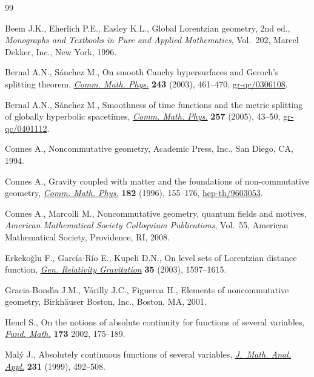 \documentclass[pdftex]{sigma}
\begin{document}
\begin{thebibliography}{99}

\footnotesize\itemsep=0pt

Beem J.K., Eherlich P.E., Easley K.L.,
Global Lorentzian geometry,  2nd ed., {\it Monographs and Textbooks in Pure and Applied Mathematics}, Vol.~202, Marcel Dekker, Inc., New York, 1996.

Bernal A.N., S\'anchez M.,
On smooth Cauchy hypersurfaces and Geroch's splitting theorem,
\href{http://dx.doi.org/10.1007/s00220-003-0982-6}{{\it Comm. Math. Phys.}} {\bf 243} (2003), 461--470,
\href{http://www.arxiv.org/abs/gr-qc/0306108}{gr-qc/0306108}.

Bernal A.N., S\'anchez M.,
Smoothness of time functions and the metric splitting of globally hyperbolic spacetimes,
\href{http://dx.doi.org/10.1007/s00220-005-1346-1}{{\it Comm. Math. Phys.}} {\bf 257} (2005), 43--50,
\href{http://www.arxiv.org/abs/gr-qc/0401112}{gr-qc/0401112}.

Connes A.,
Noncommutative geometry, Academic Press, Inc., San Diego, CA, 1994.

Connes A.,
Gravity coupled with matter and the foundations of non-commutative geometry,
\href{http://dx.doi.org/10.1007/BF02506388}{\textit{Comm. Math. Phys.}} {\bf 182} (1996), 155--176,
\href{http://arxiv.org/abs/hep-th/9603053}{hep-th/9603053}.

Connes A., Marcolli M.,
Noncommutative geometry, quantum f\/ields and motives,
{\it American Mathematical Society Colloquium Publications}, Vol.~55, American Mathematical Society, Providence, RI, 2008.

Erkeko\u{g}lu F., Garc\'ia-R\'io E., Kupeli D.N.,
On level sets of Lorentzian distance function,
\href{http://dx.doi.org/10.1023/A:1025779017980}{{\it Gen. Relativity Gravitation}} {\bf 35} (2003), 1597--1615.

Gracia-Bond\'{\i}a J.M., V\'arilly J.C., Figueroa H.,
Elements of noncommutative geometry, Birkh\"auser Boston, Inc., Boston, MA, 2001.

Hencl S.,
On the notions of absolute continuity for functions of several variables,
\href{http://dx.doi.org/10.4064/fm173-2-5}{{\it Fund. Math.}} {\bf 173} 2002, 175--189.

Mal\'y J.,
Absolutely continuous functions of several variables,
\href{http://dx.doi.org/10.1006/jmaa.1998.6246}{{\it J.~Math. Anal. Appl.}} {\bf 231} (1999), 492--508.


\end{thebibliography}
\end{document}
